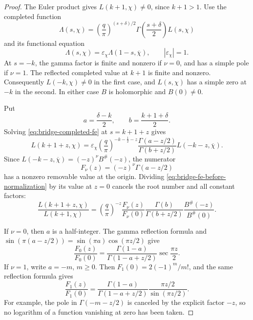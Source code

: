 \begin{proof}
The Euler product gives \(L(k+1,\chi)\ne0\), since \(k+1>1\).
Use the completed function
\[
 \Lambda(s,\chi)=
 \left(\frac q\pi\right)^{(s+\delta)/2}
 \Gamma\!\left(\frac{s+\delta}{2}\right)L(s,\chi)
\]
and its functional equation
\begin{equation}
 \Lambda(s,\chi)=\varepsilon_\chi\Lambda(1-s,\overline\chi),
 \qquad |\varepsilon_\chi|=1.
 \label{eq:bridge-completed-fe}
\end{equation}
At \(s=-k\), the gamma factor is finite and nonzero if
\(\nu=0\), and has a simple pole if \(\nu=1\).
The reflected completed value at \(k+1\) is finite and nonzero.
Consequently \(L(-k,\chi)\ne0\) in the first case, and
\(L(s,\chi)\) has a simple zero at \(-k\) in the second.
In either case \(B\) is holomorphic and \(B(0)\ne0\).

Put
\[
 a=\frac{\delta-k}{2},\qquad
 b=\frac{k+1+\delta}{2}.
\]
Solving \eqref{eq:bridge-completed-fe} at \(s=k+1+z\) gives
\begin{equation}
 L(k+1+z,\chi)
 =\varepsilon_\chi
 \left(\frac q\pi\right)^{-k-\frac12-z}
 \frac{\Gamma(a-z/2)}{\Gamma(b+z/2)}
 L(-k-z,\overline\chi).
 \label{eq:bridge-fe-before-normalization}
\end{equation}
Since
\(L(-k-z,\overline\chi)=(-z)^\nu B^\#(-z)\),
the numerator
\[
 F_\nu(z)=(-z)^\nu\Gamma(a-z/2)
\]
has a nonzero removable value at the origin.
Dividing \eqref{eq:bridge-fe-before-normalization} by its value
at \(z=0\) cancels the root number and all constant factors:
\begin{equation}
 \frac{L(k+1+z,\chi)}{L(k+1,\chi)}
 =
 \left(\frac q\pi\right)^{-z}
 \frac{F_\nu(z)}{F_\nu(0)}
 \frac{\Gamma(b)}{\Gamma(b+z/2)}
 \frac{B^\#(-z)}{B^\#(0)}.
 \label{eq:bridge-normalized-intermediate}
\end{equation}

If \(\nu=0\), then \(a\) is a half-integer.
The gamma reflection formula and
\(\sin(\pi(a-z/2))=\sin(\pi a)\cos(\pi z/2)\)
give
\begin{equation}
 \frac{F_0(z)}{F_0(0)}
 =\frac{\Gamma(1-a)}{\Gamma(1-a+z/2)}
       \sec\frac{\pi z}{2}.
 \label{eq:bridge-gamma-half-integer}
\end{equation}
If \(\nu=1\), write \(a=-m\), \(m\geq0\).
Then \(F_1(0)=2(-1)^m/m!\), and the same reflection formula
gives
\begin{equation}
 \frac{F_1(z)}{F_1(0)}
 =\frac{\Gamma(1-a)}{\Gamma(1-a+z/2)}
       \frac{\pi z/2}{\sin(\pi z/2)}.
 \label{eq:bridge-gamma-integer}
\end{equation}
For example, the pole in \(\Gamma(-m-z/2)\) is canceled by
the explicit factor \(-z\), so no logarithm of a function
vanishing at zero has been taken.


\end{proof}
